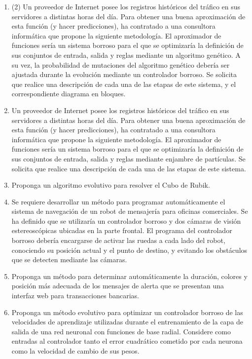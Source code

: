 \documentclass[a4paper,10pt,spanish]{article}
\begin{document}
\begin{enumerate}

\item (2) Un proveedor de Internet posee los registros históricos del tráfico en sus servidores a distintas horas del día. Para obtener una buena aproximación de esta función (y hacer predicciones), ha contratado a una consultora informática que propone la siguiente metodología. El aproximador de funciones sería un sistema borroso para el que se optimizaría la definición de sus conjuntos de entrada, salida y reglas mediante un algoritmo genético. A su vez, la probabilidad de mutaciones del algoritmo genético debería ser ajustada durante la evolución mediante un controlador borroso. Se solicita que realice una descripción de cada una de las etapas de este sistema, y el correspondiente diagrama en bloques.

\item Un proveedor de Internet posee los registros históricos del tráfico en sus servidores a distintas horas del día. Para obtener una buena aproximación de esta función (y hacer predicciones), ha contratado a una consultora informática que propone la siguiente metodología. El aproximador de funciones sería un sistema borroso para el que se optimizaría la definición de sus conjuntos de entrada, salida y reglas mediante enjambre de partículas. Se solicita que realice una descripción de cada una de las etapas de este sistema.

\item Proponga un algoritmo evolutivo para resolver el Cubo de Rubik.

\item Se requiere desarrollar un método para programar automáticamente el sistema de navegación de un robot de mensajería para oficinas comerciales. Se ha definido que se utilizaría un controlador borroso y dos cámaras de visión estereoscópicas ubicadas en la parte frontal. El programa del controlador borroso debería encargarse de activar las ruedas a cada lado del robot, conociendo su posición actual y el punto de destino, y evitando los obstáculos que se detecten mediante las cámaras.

\item Proponga un método para determinar automáticamente la duración, colores y posición más adecuada de los mensajes de alerta que se presentan una interfaz web para transacciones bancarias.

\item Proponga un método evolutivo para optimizar un controlador borroso de las velocidades de aprendizaje utilizadas durante el entrenamiento de la capa de salida de una red neuronal con funciones de base radial. Considere como entradas al controlador tanto el error cuadrático cometido por cada neurona como la velocidad de cambio de sus pesos.


\end{enumerate}
\end{document}

